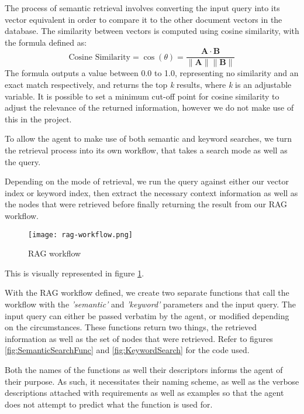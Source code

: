 The process of semantic retrieval involves converting the input query into its vector equivalent in order to compare it to the other document vectors in the database. The similarity between vectors is computed using cosine similarity, with the formula defined as:
\[
	\text{Cosine Similarity} = \cos(\theta) = \frac{\mathbf{A} \cdot \mathbf{B}}{\|\mathbf{A}\| \|\mathbf{B}\|}
\]
The formula outputs a value between 0.0 to 1.0, representing no similarity and an exact match respectively, and returns the top \textit{k} results, where \textit{k} is an adjustable variable.
It is possible to set a minimum cut-off point for cosine similarity to adjust the relevance of the returned information, however we do not make use of this in the project.

To allow the agent to make use of both semantic and keyword searches, we turn the retrieval process into its own workflow, that takes a search mode as well as the query.

Depending on the mode of retrieval, we run the query against either our vector index or keyword index, then extract the necessary context information as well as the nodes that were retrieved before finally returning the result from our RAG workflow.

\begin{figure}
	\centering
	\texttt{[image: rag-workflow.png]}
	\caption{RAG workflow}
	\label{fig:RagWorkflow}
\end{figure}

This is visually represented in figure \ref{fig:RagWorkflow}.

With the RAG workflow defined, we create two separate functions that call the workflow with the \textit{'semantic'} and \textit{'keyword'} parameters and the input query. The input query can either be passed verbatim by the agent, or modified depending on the circumstances. These functions return two things, the retrieved information as well as the set of nodes that were retrieved. Refer to figures \ref{fig:SemanticSearchFunc} and
\ref{fig:KeywordSearch} for the code used.

Both the names of the functions as well their descriptors informs the agent of their purpose. As such, it necessitates their naming scheme, as well as the verbose descriptions attached with requirements as well as examples so that the agent does not attempt to predict what the function is used for.

